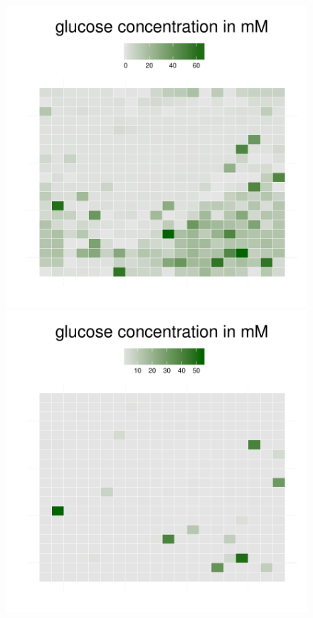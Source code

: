 \begin{figure}[h]
{\begin{minipage}[t]{0.3\textwidth}
  \end{minipage}
  \begin{minipage}[t]{0.3\textwidth}
    \includegraphics[width=\textwidth]{../results/beijerinckii_20x20_seed943_gluc50.pdf}
  \end{minipage}
  \begin{minipage}[t]{0.3\textwidth}
    \includegraphics[width=\textwidth]{../results/beijerinckii_20x20_seed943_gluc65.pdf}

\end{minipage}}
\end{figure}
